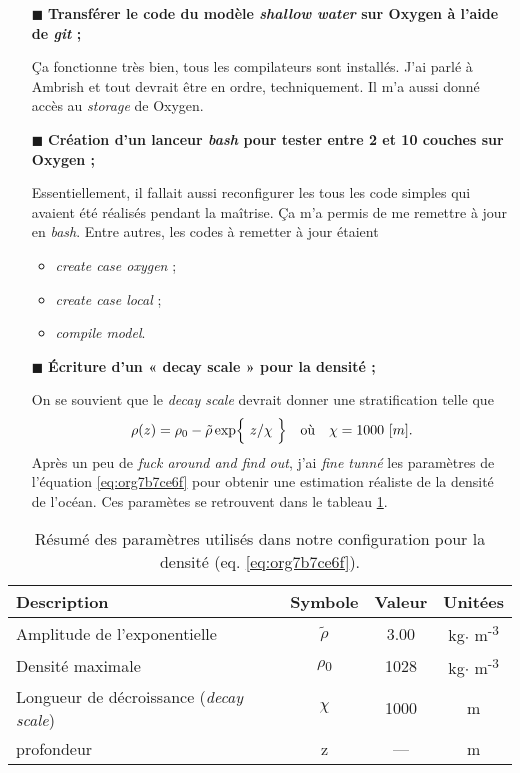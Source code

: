 \documentclass[10pt]{article}
\numberwithin{equation}{section}
\renewcommand{\boxtimes}{\blacksquare}
\newcommand{\tall}{\vphantom{pA^{x^x}_p}}
\begin{document}
\begin{itemize}
\item[{$\boxtimes$}] \textbf{Transférer le code du modèle \emph{shallow water} sur Oxygen à l'aide de \emph{git} ;}

Ça fonctionne très bien, tous les compilateurs sont installés.
J'ai parlé à Ambrish et tout devrait être en ordre, techniquement.
Il m'a aussi donné accès au \emph{storage} de Oxygen.\bigskip

\item[{$\boxtimes$}] \textbf{Création d'un lanceur \emph{bash} pour tester entre 2 et 10 couches sur Oxygen ;}

Essentiellement, il fallait aussi reconfigurer les tous les code simples qui avaient été réalisés pendant la maîtrise.
Ça m'a permis de me remettre à jour en \emph{bash}.
Entre autres, les codes à remetter à jour étaient
\begin{itemize}
\item \emph{create case oxygen} ;
\item \emph{create case local} ;
\item \emph{compile model}.\bigskip
\end{itemize}

\item[{$\boxtimes$}] \textbf{Écriture d'un « decay scale » pour la densité ;}

On se souvient que le \emph{decay scale} devrait donner une stratification telle que
\begin{align}
\label{eq:org7b7ce6f}
  && \rho(z) = \rho_0 - \tilde{\rho}\exp{\ z/\chi\tall\ } && \text{où} && \chi = 1000\ [m]. &&
\end{align}
Après un peu de \emph{fuck around and find out}, j'ai \emph{fine tunné} les paramètres de l'équation \ref{eq:org7b7ce6f} pour obtenir une estimation réaliste de la densité de l'océan.
Ces paramètes se retrouvent dans le tableau \ref{tab:orgd5f9352}.\bigskip
\end{itemize}

\begin{table}[htbp]
\caption{\label{tab:orgd5f9352}Résumé des paramètres utilisés dans notre configuration pour la densité (eq. \ref{eq:org7b7ce6f}).}
\centering
\begin{tabular}{lccc}
\hline
\hline
Description & Symbole & Valeur & Unitées\\[0pt]
\hline
Amplitude de l'exponentielle & \(\tilde{\rho}\) & 3.00 & kg\(\cdot\) m\textsuperscript{-3}\\[0pt]
Densité maximale & \(\rho\)\textsubscript{0} & 1028 & kg\(\cdot\) m\textsuperscript{-3}\\[0pt]
Longueur de décroissance (\emph{decay scale}) & \(\chi\) & 1000 & m\\[0pt]
profondeur & z & --- & m\\[0pt]
\hline
\end{tabular}
\end{table}
\end{document}
